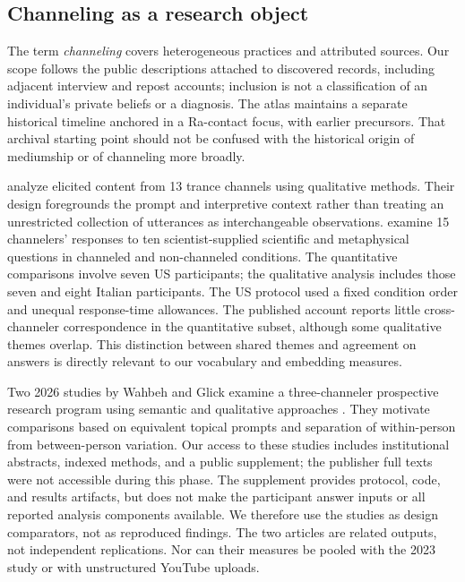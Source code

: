 \subsection{Channeling as a research object}
The term \emph{channeling} covers heterogeneous practices and attributed sources. Our scope follows the public descriptions attached to discovered records, including adjacent interview and repost accounts; inclusion is not a classification of an individual's private beliefs or a diagnosis. The atlas maintains a separate historical timeline anchored in a Ra-contact focus, with earlier precursors. That archival starting point should not be confused with the historical origin of mediumship or of channeling more broadly.

\citet{anastasia2020qualitative} analyze elicited content from 13 trance channels using qualitative methods. Their design foregrounds the prompt and interpretive context rather than treating an unrestricted collection of utterances as interchangeable observations. \citet{wahbeh2023answers} examine 15 channelers' responses to ten scientist-supplied scientific and metaphysical questions in channeled and non-channeled conditions. The quantitative comparisons involve seven US participants; the qualitative analysis includes those seven and eight Italian participants. The US protocol used a fixed condition order and unequal response-time allowances. The published account reports little cross-channeler correspondence in the quantitative subset, although some qualitative themes overlap. This distinction between shared themes and agreement on answers is directly relevant to our vocabulary and embedding measures.

Two 2026 studies by Wahbeh and Glick examine a three-channeler prospective research program using semantic and qualitative approaches \citep{wahbeh2026semantic,wahbeh2026qualitative}. They motivate comparisons based on equivalent topical prompts and separation of within-person from between-person variation. Our access to these studies includes institutional abstracts, indexed methods, and a public supplement; the publisher full texts were not accessible during this phase. The supplement provides protocol, code, and results artifacts, but does not make the participant answer inputs or all reported analysis components available. We therefore use the studies as design comparators, not as reproduced findings. The two articles are related outputs, not independent replications. Nor can their measures be pooled with the 2023 study or with unstructured YouTube uploads.

